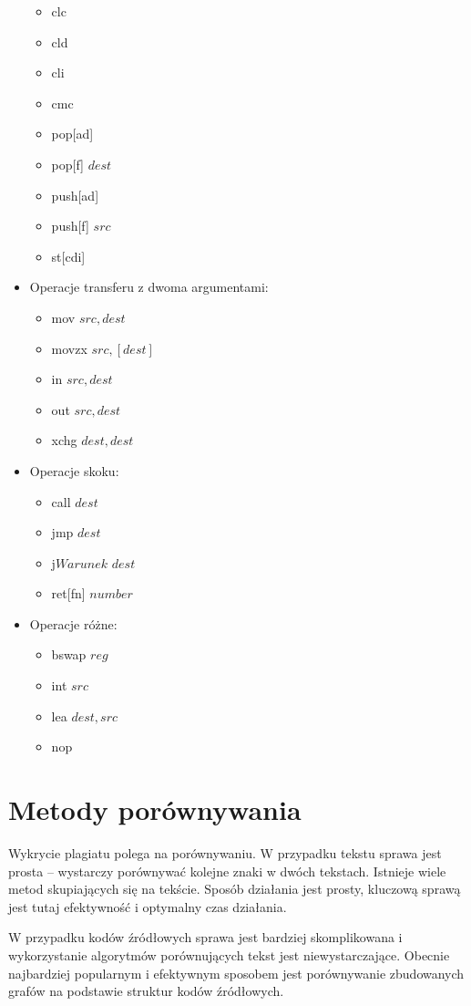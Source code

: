 \documentclass[a4paper,12pt,twoside]{article}
\begin{document}
\begin{itemize}
\begin{itemize}
	\item clc
	\item cld
	\item cli
	\item cmc
	\item pop[ad]
	\item pop[f] $dest$
	\item push[ad]
	\item push[f] $src$
	\item st[cdi]
	\end{itemize}
\item Operacje transferu z dwoma argumentami:
	\begin{itemize}
	\item mov $src, dest$
	\item movzx $src, [dest]$
	\item in $src, dest$
	\item out $src, dest$
	\item xchg $dest, dest$
	\end{itemize}
\item Operacje skoku:
	\begin{itemize}
	\item call $dest$
	\item jmp $dest$
	\item j$Warunek$ $dest$
	\item ret[fn] $number$
	\end{itemize}
\item Operacje różne:
	\begin{itemize}
	\item bswap $reg$
	\item int $src$
	\item lea $dest, src$
	\item nop
	\end{itemize}
\end{itemize}

\newpage

\section{Metody porównywania}

Wykrycie plagiatu polega na porównywaniu. W przypadku tekstu sprawa jest prosta -- wystarczy porównywać kolejne znaki w dwóch tekstach. Istnieje wiele metod skupiających się na tekście. Sposób działania jest prosty, kluczową sprawą jest tutaj efektywność i optymalny czas działania.

W przypadku kodów źródłowych sprawa jest bardziej skomplikowana i wykorzystanie algorytmów porównujących tekst jest niewystarczające. Obecnie najbardziej popularnym i efektywnym sposobem jest porównywanie zbudowanych grafów na podstawie struktur kodów źródłowych.
\end{document}
